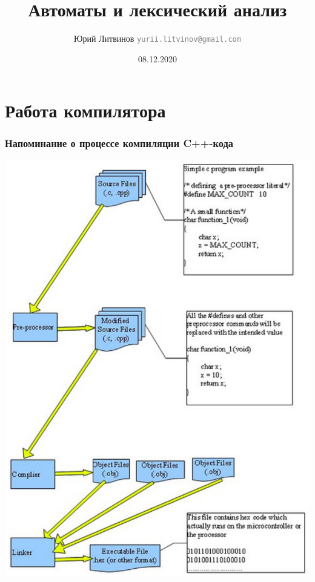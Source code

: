\documentclass[xetex,mathserif,serif]{beamer}
\title{Автоматы и лексический анализ}
\author[Юрий Литвинов]{Юрий Литвинов \newline \textcolor{gray}{\small\texttt{yurii.litvinov@gmail.com}}}
\date{08.12.2020}
\begin{document}
    
    \frame{\titlepage}

    \section{Работа компилятора}

    \begin{frame}
        \frametitle{Напоминание о процессе компиляции C++-кода}
        \begin{center}
            \includegraphics[height=0.8\textheight]{cppCompilation.png}
        \end{center}
    \end{frame}
\end{document}
